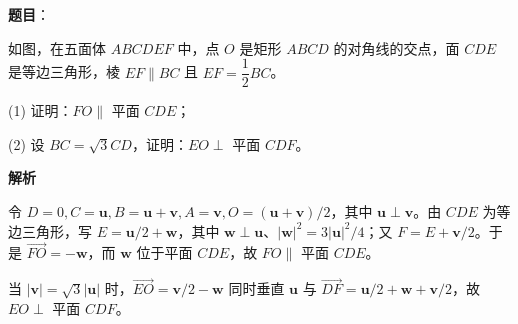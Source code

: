 \begin{answer}

\textbf{题目}：

如图，在五面体 \(ABCDEF\) 中，点 \(O\) 是矩形 \(ABCD\) 的对角线的交点，面 \(CDE\) 是等边三角形，棱 \(EF\parallel BC\) 且 \(EF=\dfrac12BC\)。

(1) 证明：\(FO\parallel\) 平面 \(CDE\)；

(2) 设 \(BC=\sqrt3CD\)，证明：\(EO\perp\) 平面 \(CDF\)。
\nopagebreak[4]
\begin{center}\end{center}
\nopagebreak[4]
\textbf{解析}


令 \(D=0,C=\mathbf u,B=\mathbf u+\mathbf v,A=\mathbf v,O=(\mathbf u+\mathbf v)/2\)，其中 \(\mathbf u\perp\mathbf v\)。由 \(CDE\) 为等边三角形，写 \(E=\mathbf u/2+\mathbf w\)，其中 \(\mathbf w\perp\mathbf u\)、\(|\mathbf w|^2=3|\mathbf u|^2/4\)；又 \(F=E+\mathbf v/2\)。于是 \(\overrightarrow{FO}=-\mathbf w\)，而 \(\mathbf w\) 位于平面 \(CDE\)，故 \(FO\parallel\) 平面 \(CDE\)。


当 \(|\mathbf v|=\sqrt3|\mathbf u|\) 时，\(\overrightarrow{EO}=\mathbf v/2-\mathbf w\) 同时垂直 \(\mathbf u\) 与 \(\overrightarrow{DF}=\mathbf u/2+\mathbf w+\mathbf v/2\)，故 \(EO\perp\) 平面 \(CDF\)。



\end{answer}

